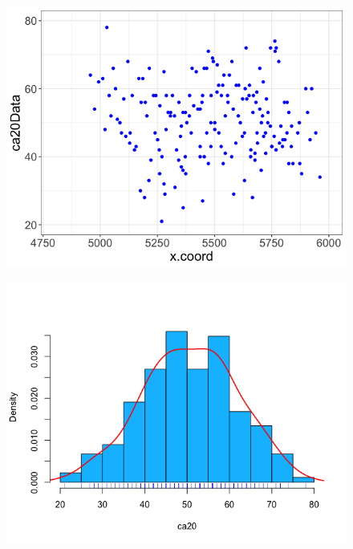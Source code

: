 \documentclass[12pt]{article}
\makeatletter
\theoremstyle{homework}
\newenvironment{exercise}[1]
{\def\@currentlabel{#1}\exercisecore}
{\endexercisecore}
\makeatother
\begin{document}
\begin{exercise}{2}
\begin{enumerate}
\begin{figure}[H]
          \begin{center}
          \includegraphics[width = .75\textwidth]{Rplot4.png}
          \end{center}
        \end{figure}
        \begin{figure}[H]
          \begin{center}
          \includegraphics[width = .75\textwidth]{Rplot5.png}
          \end{center}
        \end{figure}
    \end{enumerate}
\end{exercise}
\vspace{1in}
\end{document}
